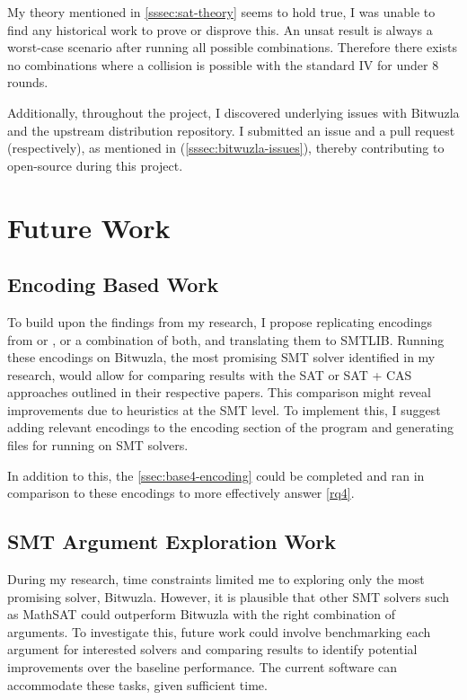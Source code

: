\documentclass[a4paper]{report}
\begin{document}
My theory mentioned in \ref{sssec:sat-theory} seems to hold true, I was unable to find any historical work to prove or disprove this.
An unsat result is always a worst-case scenario after running all possible combinations.
Therefore there exists no combinations where a collision is possible with the standard IV for under 8 rounds.

Additionally, throughout the project, I discovered underlying issues with Bitwuzla and the upstream distribution repository.
I submitted an issue and a pull request (respectively), as mentioned in (\ref{sssec:bitwuzla-issues}), thereby contributing to open-source during this project.

\section{Future Work}
\subsection{Encoding Based Work}
\label{ssec:future-encoding}
To build upon the findings from my research, I propose replicating encodings from \citet{li_2024} or \citet{alamgir_2024}, or a combination of both, and translating them to SMTLIB.
Running these encodings on Bitwuzla, the most promising SMT solver identified in my research,
would allow for comparing results with the SAT or SAT + CAS approaches outlined in their respective papers.
This comparison might reveal improvements due to heuristics at the SMT level.
To implement this, I suggest adding relevant encodings to the encoding section of the program and generating files for running on SMT solvers.

In addition to this, the \ref{ssec:base4-encoding} could be completed and ran in comparison to these encodings to more effectively answer \ref{rq4}.

\subsection{SMT Argument Exploration Work}
\label{ssec:future-argument}
During my research, time constraints limited me to exploring only the most promising solver, Bitwuzla.
However, it is plausible that other SMT solvers such as MathSAT could outperform Bitwuzla with the right combination of arguments.
To investigate this, future work could involve benchmarking each argument for interested solvers and comparing results to identify potential improvements over the baseline performance.
The current software can accommodate these tasks, given sufficient time.
\end{document}
